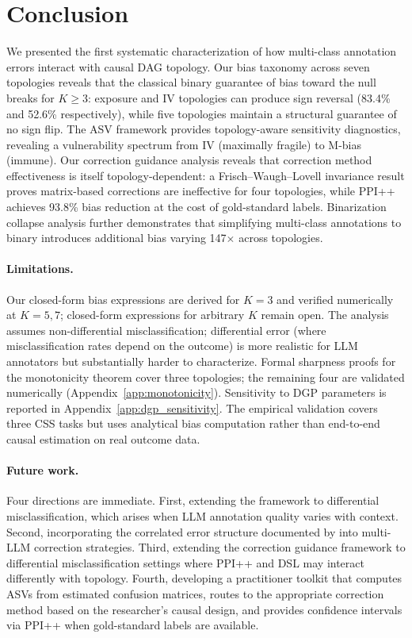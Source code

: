 \section{Conclusion}
\label{sec:conclusion}

We presented the first systematic characterization of how multi-class annotation errors interact with causal DAG topology. Our bias taxonomy across seven topologies reveals that the classical binary guarantee of bias toward the null breaks for $K \geq 3$: exposure and IV topologies can produce sign reversal (83.4\% and 52.6\% respectively), while five topologies maintain a structural guarantee of no sign flip. The ASV framework provides topology-aware sensitivity diagnostics, revealing a vulnerability spectrum from IV (maximally fragile) to M-bias (immune). Our correction guidance analysis reveals that correction method effectiveness is itself topology-dependent: a Frisch--Waugh--Lovell invariance result proves matrix-based corrections are ineffective for four topologies, while PPI++ achieves 93.8\% bias reduction at the cost of gold-standard labels. Binarization collapse analysis further demonstrates that simplifying multi-class annotations to binary introduces additional bias varying 147$\times$ across topologies.

\paragraph{Limitations.}
Our closed-form bias expressions are derived for $K{=}3$ and verified numerically at $K{=}5,7$; closed-form expressions for arbitrary $K$ remain open. The analysis assumes non-differential misclassification; differential error (where misclassification rates depend on the outcome) is more realistic for LLM annotators but substantially harder to characterize. Formal sharpness proofs for the monotonicity theorem cover three topologies; the remaining four are validated numerically (Appendix~\ref{app:monotonicity}). Sensitivity to DGP parameters is reported in Appendix~\ref{app:dgp_sensitivity}. The empirical validation covers three CSS tasks but uses analytical bias computation rather than end-to-end causal estimation on real outcome data.

\paragraph{Future work.}
Four directions are immediate. First, extending the framework to differential misclassification, which arises when LLM annotation quality varies with context. Second, incorporating the correlated error structure documented by \citet{kim_garg2025} into multi-LLM correction strategies. Third, extending the correction guidance framework to differential misclassification settings where PPI++ and DSL may interact differently with topology. Fourth, developing a practitioner toolkit that computes ASVs from estimated confusion matrices, routes to the appropriate correction method based on the researcher's causal design, and provides confidence intervals via PPI++ when gold-standard labels are available.
